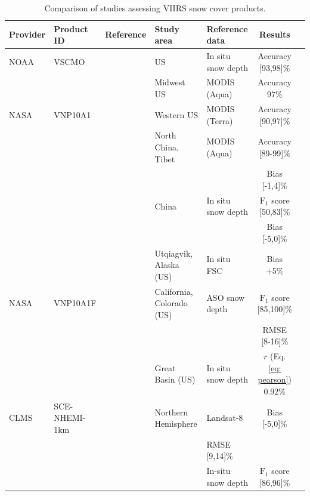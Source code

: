 \documentclass[tc, manuscript]{copernicus}
\begin{document}
\begin{table}[!t]
\caption{Comparison of studies assessing VIIRS snow cover products.}
\label{tab: tab02}
\centering
\begin{tabular}{p{0.9cm} p{2.4cm} p{4cm}  p{3.3cm} p{2.4cm} c p{3.7cm}}
\hline
Provider & Product ID   & Reference & Study area & Reference data & Results \\
\hline
NOAA & VSCMO     &  \citep{key_snow_2013} &  US &  In situ snow depth  & Accuracy  [93,98]\%  \\
& &     \citep{thapa_cross-comparison_2019} & Midwest US & MODIS (Aqua)  & Accuracy  97\% \\
NASA & VNP10A1   &  \citep{riggs_continuity_2020} & Western US & MODIS (Terra)  & Accuracy  [90,97]\% \\
 & &     \citep{liu2022EffectCloudMask} & North China, Tibet  & MODIS (Aqua) & Accuracy [89-99]\% \\
 & &     &  &  &  Bias [-1,4]\%  \\
 & &     \citep{zhang_comparative_2020} & China & In situ snow depth &  $\mathrm{F_1}$ score  [50,83]\% \\
 & &     &  &  &  Bias [-5,0]\% \\
 & &     \citep{jacques-hamilton_measurement_2025} & Utqiagvik, Alaska (US) & In situ FSC  & Bias +5\% \\
 NASA & VNP10A1F &\citep{stillinger_landsat_2023} & California, Colorado (US) & ASO snow depth  & $\mathrm{F_1}$ score  [85,100]\%  \\
& & &  &  &  RMSE [8-16]\% \\
&   &  \citep{hall_comparison_2024} & Great Basin (US) & In situ snow depth & $r$ (Eq. \ref{eq: pearson}) 0.92\%  \\
CLMS & SCE-NHEMI-1km     &  \citep{schwaizer2020SnowCoverExtentb} & Northern Hemisphere & Landsat-8 &  Bias [-5,0]\%    \\
 &  & &  & RMSE [9,14]\%    \\
 &  & & & In-situ snow depth  & $\mathrm{F_1}$ score [86,96]\%  \\
\hline
\end{tabular}
\end{table}
\end{document}
